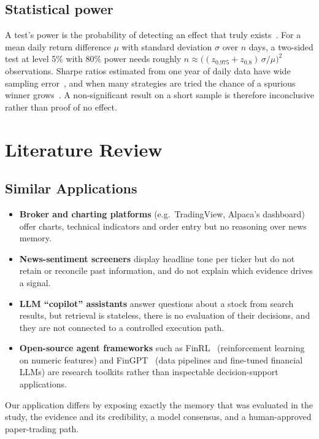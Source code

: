 \subsection{Statistical power}
A test's power is the probability of detecting an effect that truly exists~\cite{cohen1988power}. For a mean daily return difference $\mu$ with standard deviation $\sigma$ over $n$ days, a two-sided test at level 5\% with 80\% power needs roughly $n \approx \big((z_{0.975}+z_{0.8})\,\sigma/\mu\big)^2$ observations. Sharpe ratios estimated from one year of daily data have wide sampling error~\cite{lo2002sharpe}, and when many strategies are tried the chance of a spurious winner grows~\cite{harvey2016cross,bailey2014deflated}. A non-significant result on a short sample is therefore inconclusive rather than proof of no effect.

\section{Literature Review}

\subsection{Similar Applications}
\begin{itemize}
  \item \textbf{Broker and charting platforms} (e.g.\ TradingView, Alpaca's dashboard) offer charts, technical indicators and order entry but no reasoning over news memory.
  \item \textbf{News-sentiment screeners} display headline tone per ticker but do not retain or reconcile past information, and do not explain which evidence drives a signal.
  \item \textbf{LLM ``copilot'' assistants} answer questions about a stock from search results, but retrieval is stateless, there is no evaluation of their decisions, and they are not connected to a controlled execution path.
  \item \textbf{Open-source agent frameworks} such as FinRL~\cite{liu2020finrl} (reinforcement learning on numeric features) and FinGPT~\cite{yang2023fingpt} (data pipelines and fine-tuned financial LLMs) are research toolkits rather than inspectable decision-support applications.
\end{itemize}
Our application differs by exposing exactly the memory that was evaluated in the study, the evidence and its credibility, a model consensus, and a human-approved paper-trading path.


